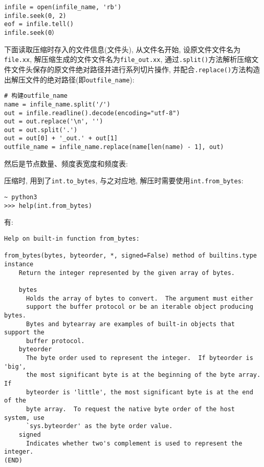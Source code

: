 \documentclass[a4paper]{ctexart}
\begin{document}
{\setmainfont{Courier New Bold}              
\begin{lstlisting}
infile = open(infile_name, 'rb')
infile.seek(0, 2)
eof = infile.tell()
infile.seek(0）
\end{lstlisting}}

下面读取压缩时存入的文件信息(文件头), 从文件名开始, 设原文件文件名为\texttt{file.xx}, 解压缩生成的文件文件名为\texttt{file\_out.xx}, 通过\texttt{.split()}方法解析压缩文件文件头保存的原文件绝对路径并进行系列切片操作, 并配合\texttt{.replace()}方法构造出解压文件的绝对路径(即\texttt{outfile\_name}):

{\setmainfont{Courier New Bold}              
\begin{lstlisting}
# 构建outfile_name
name = infile_name.split('/')
out = infile.readline().decode(encoding="utf-8")
out = out.replace('\n', '')
out = out.split('.')
out = out[0] + '_out.' + out[1]
outfile_name = infile_name.replace(name[len(name) - 1], out)
\end{lstlisting}}

然后是节点数量、频度表宽度和频度表:

压缩时, 用到了\texttt{int.to\_bytes}, 与之对应地, 解压时需要使用\texttt{int.from\_bytes}:

{\setmainfont{Courier New Bold}              
\begin{lstlisting}
~ python3
>>> help(int.from_bytes)
\end{lstlisting}}

有:

{\setmainfont{Courier New Bold}              
\begin{lstlisting}
Help on built-in function from_bytes:

from_bytes(bytes, byteorder, *, signed=False) method of builtins.type instance
    Return the integer represented by the given array of bytes.

    bytes
      Holds the array of bytes to convert.  The argument must either
      support the buffer protocol or be an iterable object producing bytes.
      Bytes and bytearray are examples of built-in objects that support the
      buffer protocol.
    byteorder
      The byte order used to represent the integer.  If byteorder is 'big',
      the most significant byte is at the beginning of the byte array.  If
      byteorder is 'little', the most significant byte is at the end of the
      byte array.  To request the native byte order of the host system, use
      `sys.byteorder' as the byte order value.
    signed
      Indicates whether two's complement is used to represent the integer.
(END)
\end{lstlisting}}
\end{document}
